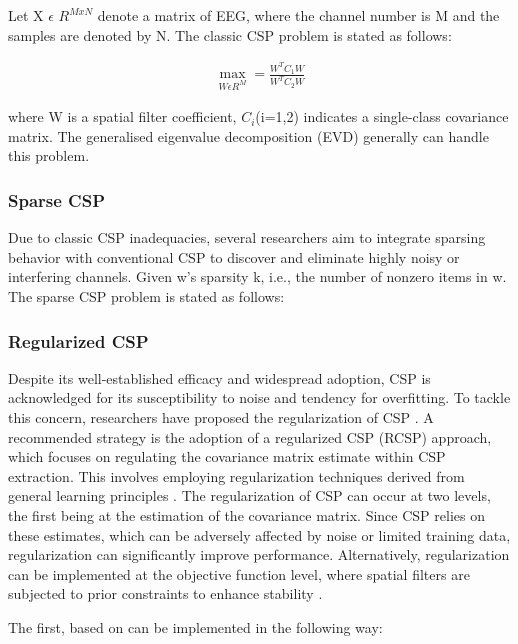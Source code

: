\documentclass{Configuration_Files/PoliMi3i_thesis}
\begin{document}
Let X $\epsilon$ $R^{M x N}$ denote a matrix of EEG, where the channel number is M and the samples are denoted by N. The classic CSP problem is stated as follows:

\begin{align}
	\max_{W \epsilon R^{M}} = \frac{W^{T} C_1 W}{W^{T} C_2 W}
	\label{eq:CSP1}
\end{align}

where W is a spatial filter coefficient, $C_{i}$(i=1,2) indicates a single-class covariance matrix. The generalised eigenvalue decomposition (EVD) generally can handle this problem. \cite{abdullahEEGChannelSelection2022}

\subsubsection{Sparse CSP}

Due to classic CSP inadequacies, several researchers aim to integrate sparsing behavior with conventional CSP to discover and eliminate highly noisy or interfering channels. Given w’s sparsity k, i.e., the number of nonzero items in w. The sparse CSP problem is stated as follows:

\subsubsection{Regularized CSP}

Despite its well-established efficacy and widespread adoption, CSP is acknowledged for its susceptibility to noise and tendency for overfitting. To tackle this concern, researchers have proposed the regularization of CSP \cite{lotteRegularizingCommonSpatial2011}. A recommended strategy is the adoption of a regularized CSP (RCSP) approach, which focuses on regulating the covariance matrix estimate within CSP extraction. This involves employing regularization techniques derived from general learning principles \cite{friedmanRegularizedDiscriminantAnalysis1989,wangSolvingFaceRecognition2006}. The regularization of CSP can occur at two levels, the first being at the estimation of the covariance matrix. Since CSP relies on these estimates, which can be adversely affected by noise or limited training data, regularization can significantly improve performance. Alternatively, regularization can be implemented at the objective function level, where spatial filters are subjected to prior constraints to enhance stability \cite{lotteRegularizingCommonSpatial2011}.

The first, based on \cite{luRegularizedCommonSpatial2009} can be implemented in the following way:
\end{document}
